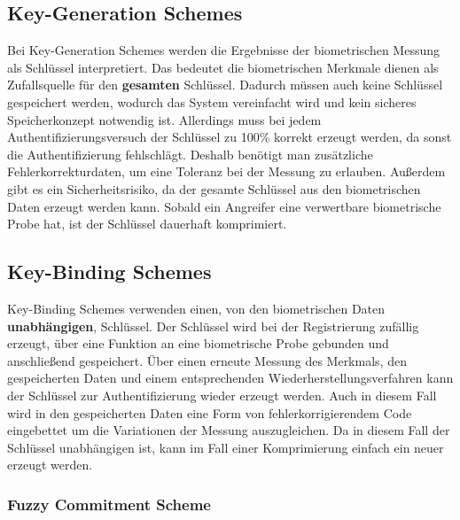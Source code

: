 \documentclass{article}
\begin{document}
    \subsection{Key-Generation Schemes}
    Bei Key-Generation Schemes werden die Ergebnisse der biometrischen Messung als Schlüssel interpretiert. Das bedeutet
    die biometrischen Merkmale dienen als Zufallsquelle für den \textbf{gesamten} Schlüssel. Dadurch müssen auch keine
    Schlüssel gespeichert werden, wodurch das System vereinfacht wird und kein sicheres Speicherkonzept notwendig ist.
    Allerdings muss bei jedem Authentifizierungsversuch der Schlüssel zu 100\% korrekt erzeugt werden, da sonst die 
    Authentifizierung fehlschlägt. Deshalb benötigt man zusätzliche Fehlerkorrekturdaten, um eine Toleranz bei der Messung
    zu erlauben. Außerdem gibt es ein Sicherheitsrisiko, da der gesamte Schlüssel aus den biometrischen Daten erzeugt werden
    kann. Sobald ein Angreifer eine verwertbare biometrische Probe hat, ist der Schlüssel dauerhaft komprimiert.
    \subsection{Key-Binding Schemes}
    Key-Binding Schemes verwenden einen, von den biometrischen Daten \textbf{unabhängigen}, Schlüssel. Der Schlüssel
    wird bei der Registrierung zufällig erzeugt, über eine Funktion an eine biometrische Probe gebunden und anschließend
    gespeichert. Über einen erneute Messung des Merkmals, den gespeicherten Daten und einem entsprechenden 
    Wiederherstellungsverfahren kann der Schlüssel zur Authentifizierung wieder erzeugt werden. Auch in diesem Fall
    wird in den gespeicherten Daten eine Form von fehlerkorrigierendem Code eingebettet um die Variationen 
    der Messung auszugleichen. Da in diesem Fall der Schlüssel unabhängigen ist, kann im Fall einer Komprimierung
    einfach ein neuer erzeugt werden. 
    \subsubsection{Fuzzy Commitment Scheme}
\end{document}
